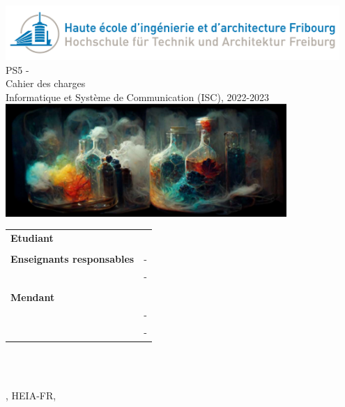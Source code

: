 
\begin{titlepage}
{\selectfont
    \begin{center}
	    \includegraphics[width=0.95\textwidth]{img/heiafr_logo}
		~\\[1.5cm]
		{
			\Huge
			PS5 - \ThesisTitle\\Cahier des charges \\[0.5cm]
			\large Informatique et Système de Communication (ISC), 2022-2023\\[2cm]
		}
		\includegraphics[width=0.8\textwidth]{img/logo.png}
		~\\[2cm]
		{
			\begin{center}
			\begin{tabularx}{\textwidth} { %
				>{\raggedright\arraybackslash}X 
				>{\raggedright\arraybackslash}X  }
					 \textbf{Etudiant} & \Author\\
					 & \\
					 \textbf{Enseignants responsables} & \Advisor \space - \AdvisorSchool \\ & \AdvisorTwo \space - \AdvisorTwoSchool \\
					 & \\
					 \textbf{Mendant} & \MendantInstitut \\ & \MendantOne \space - \MendantOneSchool \\ & \MendantTwo \space - \MendantTwoSchool\\
			\end{tabularx}
			\end{center}
			~\\[1.5cm]
		}

		\vfill
		
		 
		
	    {\cdcVersion}\\
		{\large \Place, HEIA-FR, \Date}
		
	\end{center}
}
\restoregeometry
\end{titlepage}




